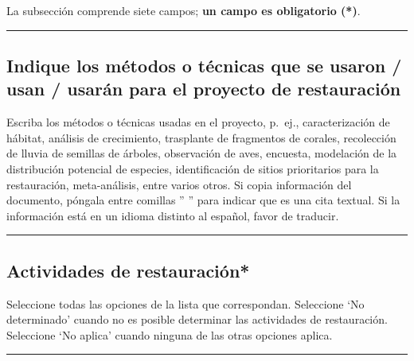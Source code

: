 \documentclass[
]{book}
\begin{document}
La subsección comprende siete campos; \textbf{un campo es obligatorio ({*})}.

\begin{center}\rule{0.5\linewidth}{0.5pt}\end{center}

\hypertarget{indique-los-muxe9todos-o-tuxe9cnicas-que-se-usaron-usan-usaruxe1n-para-el-proyecto-de-restauraciuxf3n}{%
\subsection*{Indique los métodos o técnicas que se usaron / usan / usarán para el proyecto de restauración}\label{indique-los-muxe9todos-o-tuxe9cnicas-que-se-usaron-usan-usaruxe1n-para-el-proyecto-de-restauraciuxf3n}}

Escriba los métodos o técnicas usadas en el proyecto, p.~ej., caracterización de hábitat, análisis de crecimiento, trasplante de fragmentos de corales, recolección de lluvia de semillas de árboles, observación de aves, encuesta, modelación de la distribución potencial de especies, identificación de sitios prioritarios para la restauración, meta-análisis, entre varios otros. Si copia información del documento, póngala entre comillas '' '' para indicar que es una cita textual. Si la información está en un idioma distinto al español, favor de traducir.

\begin{center}\rule{0.5\linewidth}{0.5pt}\end{center}

\hypertarget{actividades-de-restauraciuxf3n}{%
\subsection*{\texorpdfstring{{Actividades de restauración*}}{Actividades de restauración*}}\label{actividades-de-restauraciuxf3n}}

Seleccione todas las opciones de la lista que correspondan.
Seleccione `No determinado' cuando no es posible determinar las actividades de restauración.
Seleccione `No aplica' cuando ninguna de las otras opciones aplica.

\begin{center}\rule{0.5\linewidth}{0.5pt}\end{center}
\end{document}

